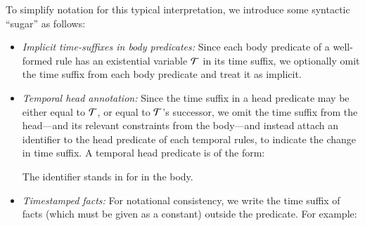 To simplify \slang notation for this typical interpretation, we
introduce some syntactic ``sugar'' as follows:

\begin{itemize}
%
%
\item {\em Implicit time-suffixes in body predicates:} Since each body
predicate of a well-formed rule has an existential variable $\Tau$ in its
time suffix, we optionally omit the time suffix from each body predicate and treat
it as implicit.
%
\item {\em Temporal head annotation:} Since the time suffix in a head predicate
may be either equal to $\Tau$, or equal to $\Tau$'s successor, we omit the time
suffix from the head---and its relevant constraints from the body---and
instead attach an identifier to the head predicate of each temporal rules, to indicate the change in
time suffix.  A temporal head predicate is of the form:


The identifier  stands in for  in
the body.

\item {\em Timestamped facts:} For notational consistency, we write the time suffix of facts (which
must be given as a constant) outside the predicate.  For example:


%
%
%
%
%
\end{itemize}

